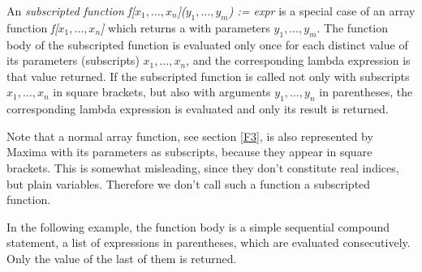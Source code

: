 \documentclass[../Maxima_Workbook.tex]{subfiles}
\begin{document}

\lz {}

\lz An \emph{subscripted function} \emph{ f[$x_1,\dots, x_n$]($y_1,\dots, y_m $) := expr} is a special case of an array function \emph{f[$ x_1,\dots, x_n $]} which returns a  with parameters $ y_1, \dots, y_m $. The function body of the subscripted function is evaluated only once for each distinct value of its parameters (subscripts) $ x_1, \dots, x_n $, and the corresponding lambda expression is that value returned. If the subscripted function is called not only with subscripts $ x_1, \dots, x_n $ in square brackets, but also with arguments $ y_1, \dots, y_n $ in parentheses, the corresponding lambda expression is evaluated and only its result is returned.

\lz Note that a normal array function, see section \ref{F3}, is also represented by Maxima with its parameters as subscripts, because they appear in square brackets. This is somewhat misleading, since they don't constitute real indices, but plain variables. Therefore we don't call such a function a subscripted function.

\lz In the following example, the function body is a simple sequential compound statement, a list of expressions in parentheses, which are evaluated consecutively. Only the value of the last of them is returned.
\end{document}
